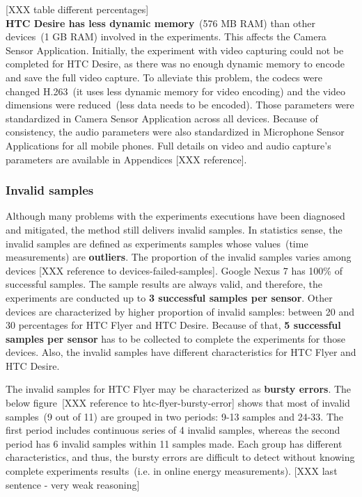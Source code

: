 [XXX table different percentages]\\

\textbf{HTC Desire has less dynamic memory}\ (576 MB RAM) than other devices\ (1 GB RAM) involved in the experiments. This affects the Camera Sensor Application. Initially, the experiment with video capturing could not be completed for HTC Desire, as there was no enough dynamic memory to encode and save the full video capture.  To alleviate this problem, the codecs were changed H.263\ (it uses less dynamic memory for video encoding) and the video dimensions were reduced\ (less data needs to be encoded). Those parameters were standardized in Camera Sensor Application across all devices. Because of consistency, the audio parameters were also standardized in Microphone Sensor Applications for all mobile phones. Full details on video and audio capture's parameters are available in Appendices [XXX reference].
			
\subsubsection{Invalid samples}
Although many problems with the experiments executions have been diagnosed and mitigated, the method still delivers invalid samples. In statistics sense, the invalid samples are defined as experiments samples whose values\ (time measurements) are \textbf{outliers}.  The proportion of the invalid samples varies among devices [XXX reference to devices-failed-samples]. Google Nexus 7 has 100\% of successful samples. The sample results are always valid, and therefore, the experiments are conducted up to \textbf{3 successful samples per sensor}. Other devices are characterized by higher proportion of invalid samples: between 20 and 30 percentages for HTC Flyer and HTC Desire. Because of that, \textbf{5 successful samples per sensor} has to be collected to complete the experiments for those devices. Also, the invalid samples have different characteristics for HTC Flyer and HTC Desire. 

	
The invalid samples for HTC Flyer may be characterized as \textbf{bursty errors}. The below figure\ [XXX reference to htc-flyer-bursty-error] shows that most of invalid samples\ (9 out of 11) are grouped in two periods: 9-13 samples and 24-33. The first period includes continuous series of 4 invalid samples, whereas the second period has 6 invalid samples within 11 samples made. Each group has different characteristics, and thus, the bursty errors are difficult to detect without knowing complete experiments results\ (i.e. in online energy measurements).   [XXX last sentence - very weak reasoning]

